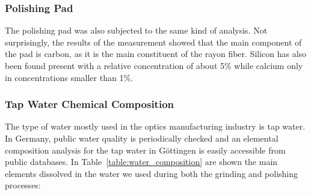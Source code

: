 \subsubsection{Polishing Pad}
\label{subsubsec:polishing_pad_meas}
The polishing pad was also subjected to the same kind of analysis. Not surprisingly, the results of the measurement showed that the main component of the pad is carbon, as it is the main constituent of the rayon fiber. Silicon has also been found present with a relative concentration of about 5\% while calcium only in concentrations smaller than 1\%.


\subsubsection{Tap Water Chemical Composition}
\label{subsubsec:polishing_pad_meas}
The type of water mostly used in the optics manufacturing industry is tap water. In Germany, public water quality is periodically checked and an elemental composition analysis for the tap water in Göttingen is easily accessible from public databases. In Table~\ref{table:water_composition} are shown the main elements dissolved in the water we used during both the grinding and polishing processes:

